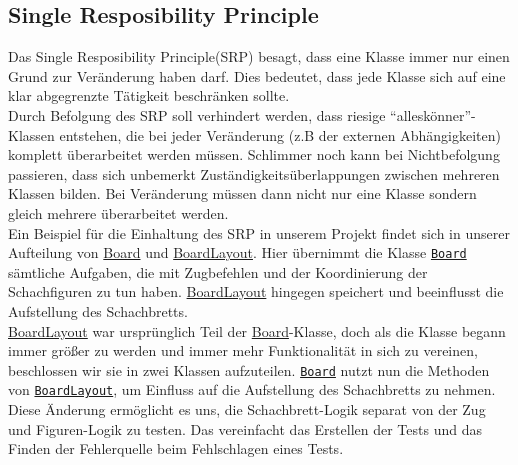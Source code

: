 \documentclass[
10pt, %
a4paper, %
oneside, %
headinclude,footinclude, %
BCOR5mm, %
]{scrartcl}
\begin{document}
\begin{onehalfspace}
\subsection{Single Resposibility Principle}
Das Single Resposibility Principle(SRP) besagt, dass eine Klasse immer nur einen Grund zur Veränderung haben darf. Dies bedeutet, dass jede Klasse sich auf eine klar abgegrenzte Tätigkeit beschränken sollte. 
\\
Durch Befolgung des SRP soll verhindert werden, dass riesige \enquote{alleskönner}-Klassen entstehen, die bei jeder Veränderung (z.B der externen Abhängigkeiten) komplett überarbeitet werden müssen. Schlimmer noch kann bei Nichtbefolgung passieren, dass sich unbemerkt Zuständigkeitsüberlappungen zwischen mehreren Klassen bilden. Bei Veränderung müssen dann nicht nur eine Klasse sondern gleich mehrere überarbeitet werden.
\\
Ein Beispiel für die Einhaltung des SRP in unserem Projekt findet sich in unserer Aufteilung von \href{https://github.com/schmida736/Chess-AdvancedSE/blob/main/Chess-AdvancedSE/Game\%20Elements/Board.cs}{Board} und \href{https://github.com/schmida736/Chess-AdvancedSE/blob/main/Chess-AdvancedSE/Game\%20Elements/BoardLayout.cs}{BoardLayout}. Hier übernimmt die Klasse \texttt{\href{https://github.com/schmida736/Chess-AdvancedSE/blob/main/Chess-AdvancedSE/Game\%20Elements/Board.cs}{Board}} sämtliche Aufgaben, die mit Zugbefehlen und der Koordinierung der Schachfiguren zu tun haben. \href{https://github.com/schmida736/Chess-AdvancedSE/blob/main/Chess-AdvancedSE/Game\%20Elements/BoardLayout.cs}{BoardLayout} hingegen speichert und beeinflusst die Aufstellung des Schachbretts.
\\
\href{https://github.com/schmida736/Chess-AdvancedSE/blob/main/Chess-AdvancedSE/Game\%20Elements/BoardLayout.cs}{BoardLayout} war ursprünglich Teil der \href{https://github.com/schmida736/Chess-AdvancedSE/blob/main/Chess-AdvancedSE/Game\%20Elements/Board.cs}{Board}-Klasse, doch als die Klasse begann immer größer zu werden und immer mehr Funktionalität in sich zu vereinen, beschlossen wir sie in zwei Klassen aufzuteilen.
\texttt{\href{https://github.com/schmida736/Chess-AdvancedSE/blob/main/Chess-AdvancedSE/Game\%20Elements/Board.cs}{Board}} nutzt nun die Methoden von \texttt{\href{https://github.com/schmida736/Chess-AdvancedSE/blob/main/Chess-AdvancedSE/Game\%20Elements/BoardLayout.cs}{BoardLayout}}, um Einfluss auf die Aufstellung des Schachbretts zu nehmen.
\\
Diese Änderung ermöglicht es uns, die Schachbrett-Logik separat von der Zug und Figuren-Logik zu testen. Das vereinfacht das Erstellen der Tests und das Finden der Fehlerquelle beim Fehlschlagen eines Tests.

\end{onehalfspace}
\end{document}
